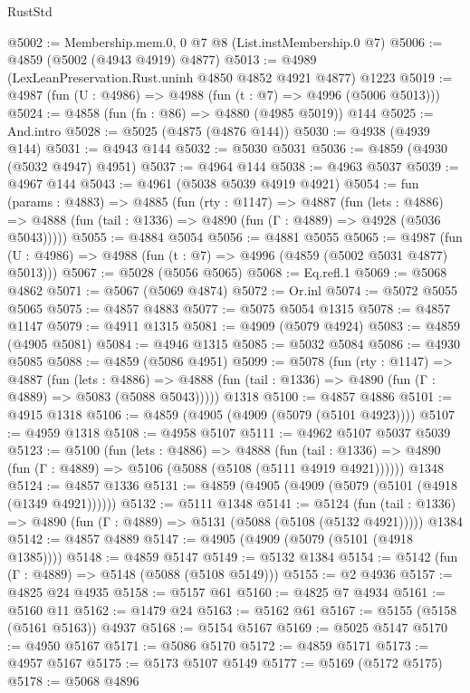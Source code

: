 \begin{lexlean}{RustStd}
\begin{coremodule}
@5002 := Membership.mem.{0, 0} @7 @8 (List.instMembership.{0} @7)
@5006 := @4859 (@5002 (@4943 @4919) @4877)
@5013 := @4989 (LexLeanPreservation.Rust.uninh @4850 @4852 @4921 @4877) @1223
@5019 := @4987 (fun (U : @4986) => @4988 (fun (t : @7) => @4996 (@5006 @5013)))
@5024 := @4858 (fun (fn : @86) => @4880 (@4985 @5019)) @144
@5025 := And.intro
@5028 := @5025 (@4875 (@4876 @144))
@5030 := @4938 (@4939 @144)
@5031 := @4943 @144
@5032 := @5030 @5031
@5036 := @4859 (@4930 (@5032 @4947) @4951)
@5037 := @4964 @144
@5038 := @4963 @5037
@5039 := @4967 @144
@5043 := @4961 (@5038 @5039 @4919 @4921)
@5054 := fun (params : @4883) =>
  @4885
    (fun (rty : @1147) =>
    @4887
      (fun (lets : @4886) =>
      @4888 (fun (tail : @1336) => @4890 (fun (Γ : @4889) => @4928 (@5036 @5043)))))
@5055 := @4884 @5054
@5056 := @4881 @5055
@5065 := @4987 (fun (U : @4986) => @4988 (fun (t : @7) => @4996 (@4859 (@5002 @5031 @4877) @5013)))
@5067 := @5028 (@5056 @5065)
@5068 := Eq.refl.{1}
@5069 := @5068 @4862
@5071 := @5067 (@5069 @4874)
@5072 := Or.inl
@5074 := @5072 @5055 @5065
@5075 := @4857 @4883
@5077 := @5075 @5054 @1315
@5078 := @4857 @1147
@5079 := @4911 @1315
@5081 := @4909 (@5079 @4924)
@5083 := @4859 (@4905 @5081)
@5084 := @4946 @1315
@5085 := @5032 @5084
@5086 := @4930 @5085
@5088 := @4859 (@5086 @4951)
@5099 := @5078
    (fun (rty : @1147) =>
    @4887
      (fun (lets : @4886) =>
      @4888 (fun (tail : @1336) => @4890 (fun (Γ : @4889) => @5083 (@5088 @5043)))))
    @1318
@5100 := @4857 @4886
@5101 := @4915 @1318
@5106 := @4859 (@4905 (@4909 (@5079 (@5101 @4923))))
@5107 := @4959 @1318
@5108 := @4958 @5107
@5111 := @4962 @5107 @5037 @5039
@5123 := @5100
    (fun (lets : @4886) =>
    @4888
      (fun (tail : @1336) => @4890 (fun (Γ : @4889) => @5106 (@5088 (@5108 (@5111 @4919 @4921))))))
    @1348
@5124 := @4857 @1336
@5131 := @4859 (@4905 (@4909 (@5079 (@5101 (@4918 (@1349 @4921))))))
@5132 := @5111 @1348
@5141 := @5124
    (fun (tail : @1336) => @4890 (fun (Γ : @4889) => @5131 (@5088 (@5108 (@5132 @4921)))))
    @1384
@5142 := @4857 @4889
@5147 := @4905 (@4909 (@5079 (@5101 (@4918 @1385))))
@5148 := @4859 @5147
@5149 := @5132 @1384
@5154 := @5142 (fun (Γ : @4889) => @5148 (@5088 (@5108 @5149)))
@5155 := @2 @4936
@5157 := @4825 @24 @4935
@5158 := @5157 @61
@5160 := @4825 @7 @4934
@5161 := @5160 @11
@5162 := @1479 @24
@5163 := @5162 @61
@5167 := @5155 (@5158 (@5161 @5163)) @4937
@5168 := @5154 @5167
@5169 := @5025 @5147
@5170 := @4950 @5167
@5171 := @5086 @5170
@5172 := @4859 @5171
@5173 := @4957 @5167
@5175 := @5173 @5107 @5149
@5177 := @5169 (@5172 @5175)
@5178 := @5068 @4896

\end{coremodule}
\end{lexlean}
